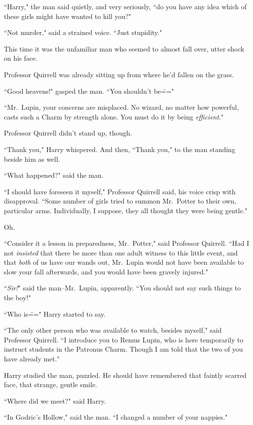 ``Harry," the man said quietly, and very seriously, ``do you have any idea which of these girls might have wanted to kill you?"

``Not murder," said a strained voice. ``Just stupidity."

This time it was the unfamiliar man who seemed to almost fall over, utter shock on his face.

Professor Quirrell was already sitting up from where he'd fallen on the grass.

``Good heavens!" gasped the man. ``You shouldn't be\==="

``Mr.~Lupin, your concerns are misplaced. No wizard, no matter how powerful, casts such a Charm by strength alone. You must do it by being \emph{efficient}."

Professor Quirrell didn't stand up, though.

``Thank you," Harry whispered. And then, ``Thank you," to the man standing beside him as well.

``What happened?" said the man.

``I should have foreseen it myself," Professor Quirrell said, his voice crisp with disapproval. ``Some number of girls tried to summon Mr.~Potter to their own, particular arms. Individually, I suppose, they all thought they were being gentle."

Oh.

``Consider it a lesson in preparedness, Mr.~Potter," said Professor Quirrell. ``Had I not \emph{insisted} that there be more than one adult witness to this little event, and that \emph{both} of us have our wands out, Mr.~Lupin would not have been available to slow your fall afterwards, and you would have been gravely injured."

``\emph{Sir!}" said the man\---Mr.~Lupin, apparently. ``You should not say such things to the boy!"

``Who is\===" Harry started to say.

``The only other person who was available to watch, besides myself," said Professor Quirrell. ``I introduce you to Remus Lupin, who is here temporarily to instruct students in the Patronus Charm. Though I am told that the two of you have already met."

Harry studied the man, puzzled. He should have remembered that faintly scarred face, that strange, gentle smile.

``Where did we meet?" said Harry.

``In Godric's Hollow," said the man. ``I changed a number of your nappies."

